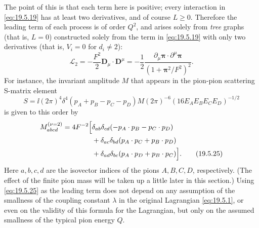 The point of this is that each term here is positive; every interaction in \eqref{eq:19.5.19} has at least two derivatives, and of course $L\geq0$. Therefore the leading term of each process is of order $Q^2$, and arises solely from \emph{tree} graphs (that is, $L=0$) constructed solely from the term in \eqref{eq:19.5.19} with only two derivatives (that is, $V_i=0$ for $d_i\neq2$):
\begin{equation}
\mathcal L_2
=-\frac{F^2}{2}\boldsymbol D_\mu\cdot\boldsymbol D^\mu
=-\frac{1}{2}
\frac{\partial_\mu\boldsymbol{\pi}\cdot
\partial^\mu\boldsymbol{\pi}}
{(1+\boldsymbol{\pi}^2/F^2)^2}.
\tag{19.5.23}\label{eq:19.5.23}
\end{equation}
For instance, the invariant amplitude $M$ that appears in the pion-pion scattering S-matrix element
\begin{equation}
S=\ii(2\pi)^4\delta^4(p_A+p_B-p_C-p_D)M
(2\pi)^{-6}(16E_AE_BE_CE_D)^{-1/2}
\tag{19.5.24}\label{eq:19.5.24}
\end{equation}
is given to this order by
\begin{align}
M_{abcd}^{(\nu=2)}
=4F^{-2}\Big[&
\delta_{ab}\delta_{cd}(-p_A\cdot p_B-p_C\cdot p_D)
\notag\\
&+\delta_{ac}\delta_{bd}(p_A\cdot p_C+p_B\cdot p_D)
\notag\\
&+\delta_{ad}\delta_{bc}(p_A\cdot p_D+p_B\cdot p_C)
\Big].
\tag{19.5.25}\label{eq:19.5.25}
\end{align}
Here $a,b,c,d$ are the isovector indices of the pions $A,B,C,D$, respectively. (The effect of the finite pion mass will be taken up a little later in this section.) Using \eqref{eq:19.5.25} as the leading term does not depend on any assumption of the smallness of the coupling constant $\lambda$ in the original Lagrangian \eqref{eq:19.5.1}, or even on the validity of this formula for the Lagrangian, but only on the assumed smallness of the typical pion energy $Q$.

